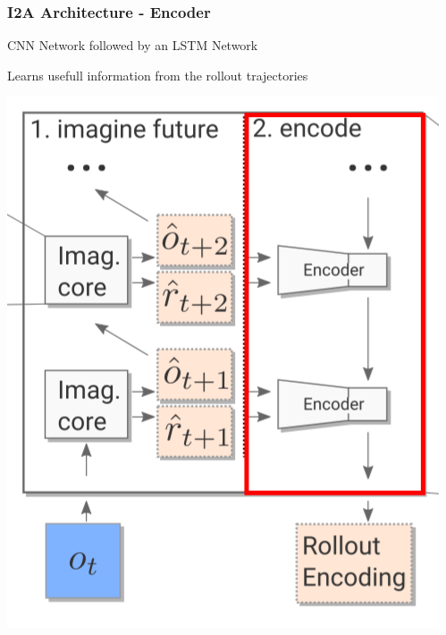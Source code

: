 \begin{frame}
    \frametitle{I2A Architecture - Encoder}

\begin{multicols}{2}
	\begin{PraesentationAufzaehlung}
		\item CNN Network followed by an LSTM Network
		\item Learns usefull information from the rollout trajectories
	\end{PraesentationAufzaehlung}
    \vfill\columnbreak
	\begin{center}
    \includegraphics[height=.5\textheight]{./Images/encoder.png}%
	\end{center}
\end{multicols}
    
\end{frame}
\clearpage

